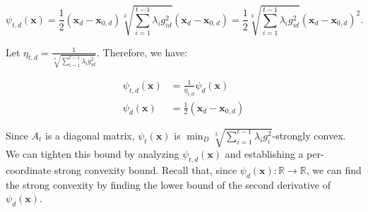 \documentclass{article}
\newcommand{\R}{\mathbb{R}}
\newcommand{\bx}{\mathbf{x}}
\begin{document}
\[
  \psi_{t,d}(\bx) = \frac{1}{2} (\bx_d - \bx_{0,d})\sqrt[3]{\sum\limits_{i=1}^{t-1} \lambda_i g_{id}^2}(\bx_d -
  \bx_{0,d}) = \frac{1}{2}\sqrt[3]{\sum\limits_{i=1}^{t-1} \lambda_i g_{id}^2}(\bx_d - \bx_{0,d})^2.
\]

Let $\eta_{t,d} = \frac{1}{\sqrt[3]{\sum\limits_{i=1}^{t-1} \lambda_i g_{id}^2}}$. Therefore, we have:

\begin{align*}
  \psi_{t,d} (\bx) &= \frac{1}{\eta_{t,d}} \psi_d(\bx) \\
  \psi_d(\bx) &= \frac{1}{2} (\bx_d - \bx_{0,d})
\end{align*}

Since $A_t$ is a diagonal matrix, $\psi_t(\bx)$ is $\min_{D} \sqrt[3]{\sum\limits_{i=1}^{t-1} \lambda_i
g_{i}^2}$-strongly convex. We can tighten this bound by analyzing $\psi_{t,d}(\bx)$ and establishing a per-coordinate
strong convexity bound. Recall that, since $\psi_d(\bx): \R \rightarrow \R$, we can find the strong convexity by finding
the lower bound of the second derivative of $\psi_d(\bx)$.





\end{document}
